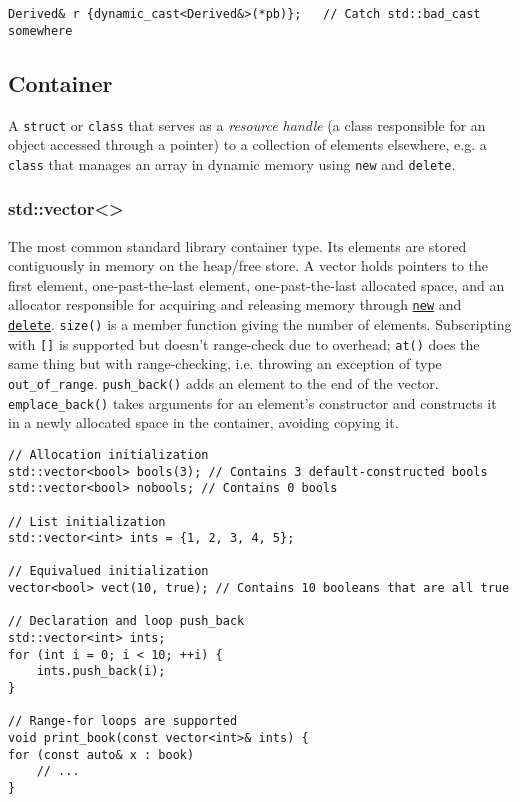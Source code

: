 \documentclass[8pt, table, xcdraw]{article}%
\begin{document}
\begin{lstlisting}
Derived& r {dynamic_cast<Derived&>(*pb)};   // Catch std::bad_cast somewhere
\end{lstlisting}

\subsection{Container}

A \lstinline{struct} or \lstinline{class} that serves as a \textit{resource handle} (a class responsible for an object accessed through a pointer) to a collection of elements elsewhere, e.g. a \lstinline{class} that manages an array in dynamic memory using \lstinline{new} and \lstinline{delete}.

\subsubsection{std::vector<>} \label{std_vector}

The most common standard library container type. Its elements are stored contiguously in memory on the heap/free store. A vector holds pointers to the first element, one-past-the-last element, one-past-the-last allocated space, and an allocator responsible for acquiring and releasing memory through \hyperref[new]{\lstinline{new}} and \hyperref[delete]{\lstinline{delete}}. \lstinline{size()} is a member function giving the number of elements. Subscripting with \lstinline{[]} is supported but doesn't range-check due to overhead; \lstinline{at()} does the same thing but with range-checking, i.e. throwing an exception of type \lstinline{out_of_range}. \lstinline{push_back()} adds an element to the end of the vector. \lstinline{emplace_back()} takes arguments for an element’s constructor and constructs it in a newly allocated space in the container, avoiding copying it.

\begin{lstlisting}
// Allocation initialization
std::vector<bool> bools(3); // Contains 3 default-constructed bools
std::vector<bool> nobools; // Contains 0 bools

// List initialization
std::vector<int> ints = {1, 2, 3, 4, 5};

// Equivalued initialization
vector<bool> vect(10, true); // Contains 10 booleans that are all true

// Declaration and loop push_back
std::vector<int> ints;
for (int i = 0; i < 10; ++i) {
    ints.push_back(i);
}

// Range-for loops are supported
void print_book(const vector<int>& ints) {
for (const auto& x : book)
    // ...
}
\end{lstlisting}
\end{document}
